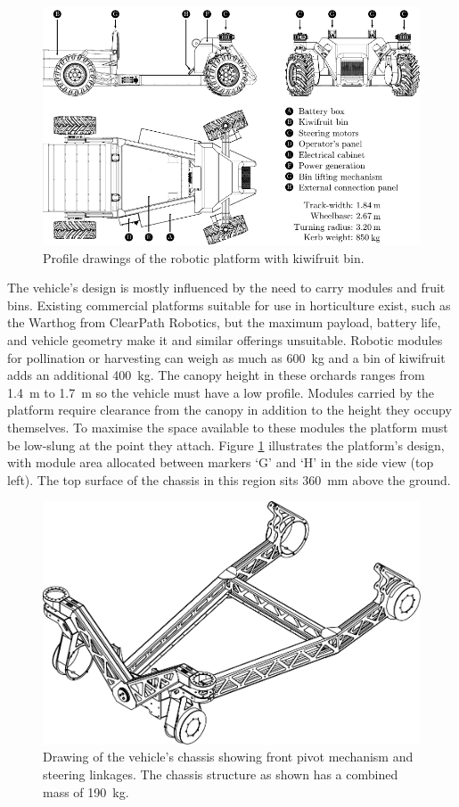 \documentclass[preprint,authoryear,12pt]{elsarticle}
\begin{document}
        \begin{figure}[htb]
            \centering
            \includegraphics[width=\linewidth]{imgs/profile_views/AMMP-All-Labelled.pdf}
            \caption{Profile drawings of the robotic platform with kiwifruit bin.}
            \label{fig:AMMP}
        \end{figure}

        The vehicle's design is mostly influenced by the need to carry modules and fruit bins.
        Existing commercial platforms suitable for use in horticulture exist, such as the Warthog from ClearPath Robotics, but the maximum payload, battery life, and vehicle geometry make it and similar offerings unsuitable.
        Robotic modules for pollination or harvesting can weigh as much as \SI{600}{\kilo\gram} and a bin of kiwifruit adds an additional \SI{400}{\kilo\gram}.
        The canopy height in these orchards ranges from \SI{1.4}{\meter} to \SI{1.7}{\meter} so the vehicle must have a low profile.
        Modules carried by the platform require clearance from the canopy in addition to the height they occupy themselves.
        To maximise the space available to these modules the platform must be low-slung at the point they attach.
        Figure \ref{fig:AMMP} illustrates the platform's design, with module area allocated between markers `G' and `H' in the side view (top left).
        The top surface of the chassis in this region sits \SI{360}{\milli\meter} above the ground.

        \begin{figure}[htb]
            \centering
            \includegraphics[width=0.6\linewidth]{imgs/profile_views/AMMP-Chassis-1-20.pdf}
            \caption{Drawing of the vehicle's chassis showing front pivot mechanism and steering linkages. The chassis structure as shown has a combined mass of \SI{190}{\kilo\gram}.}
            \label{fig:AMMPChassis}
        \end{figure}
\end{document}
